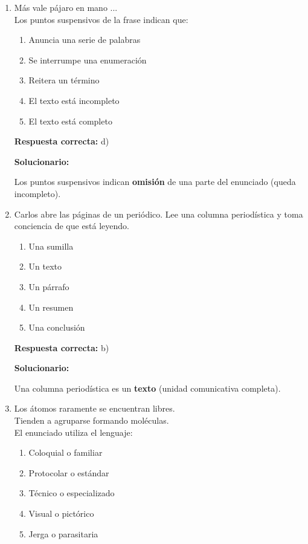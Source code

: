 \begin{enumerate}[resume]



\item  Más vale pájaro en mano ...\\
Los puntos suspensivos de la frase indican que:
\begin{enumerate}[label=\alph*)]
	\item Anuncia una serie de palabras
	\item Se interrumpe una enumeración
	\item Reitera un término
	\item El texto está incompleto
	\item El texto está completo
\end{enumerate}

\textbf{Respuesta correcta:} d)

\vspace{2mm}
\textbf{Solucionario:}

Los puntos suspensivos indican \textbf{omisión} de una parte del enunciado (queda incompleto).

\item Carlos abre las páginas de un periódico. Lee una columna periodística y toma conciencia de que está leyendo.
\begin{enumerate}[label=\alph*)]
	\item Una sumilla
	\item Un texto
	\item Un párrafo
	\item Un resumen
	\item Una conclusión
\end{enumerate}

\textbf{Respuesta correcta:} b)

\vspace{2mm}
\textbf{Solucionario:}

Una columna periodística es un \textbf{texto} (unidad comunicativa completa).

\item  Los átomos raramente se encuentran libres.\\
Tienden a agruparse formando moléculas.\\
El enunciado utiliza el lenguaje:
\begin{enumerate}[label=\alph*)]
	\item Coloquial o familiar
	\item Protocolar o estándar
	\item Técnico o especializado
	\item Visual o pictórico
	\item Jerga o parasitaria
\end{enumerate}


\end{enumerate}

